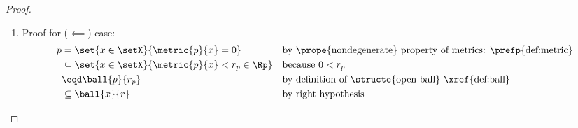 \begin{proof}
\begin{enumerate}

  \item Proof for ($\impliedby$) case:
    \begin{align*}
      p &=    \set{x\in\setX}{\metric{p}{x}=0}
        &&    \text{by \prope{nondegenerate} property of metrics: \prefp{def:metric}}
      \\&\subseteq \set{x\in\setX}{\metric{p}{x}<r_p\in\Rp}
        &&    \text{because $0<r_p$}
      \\&\eqd \ball{p}{r_p}
        &&    \text{by definition of \structe{open ball} \xref{def:ball}}
      \\&\subseteq \ball{x}{r}
        &&    \text{by right hypothesis}
    \end{align*}

\end{enumerate}

\end{proof}



